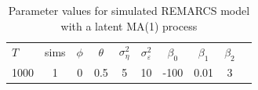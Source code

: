 \begin{table}[H]
\centering\begin{tabular}{lccccccccc}
\hline
$T$ & sims & $\phi$ & $\theta$ & $\sigma_\eta^2$ & $\sigma_\varepsilon^2$ & $\beta_0$ & $\beta_1$ & $\beta_2$ \\
1000 & 1 & 0 & 0.5 & 5 & 10 & -100 & 0.01 & 3 \\
\hline
\end{tabular}
\caption{Parameter values for simulated REMARCS model with a latent MA(1) process}
\label{tab:param_values_ar}
\end{table}

